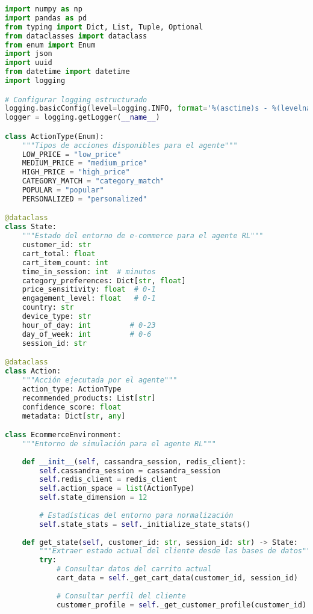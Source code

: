 \begin{lstlisting}[language=python, caption=Implementación Completa del Agente Q-Learning, label=lst:ql_implementation]
import numpy as np
import pandas as pd
from typing import Dict, List, Tuple, Optional
from dataclasses import dataclass
from enum import Enum
import json
import uuid
from datetime import datetime
import logging

# Configurar logging estructurado
logging.basicConfig(level=logging.INFO, format='%(asctime)s - %(levelname)s - %(message)s')
logger = logging.getLogger(__name__)

class ActionType(Enum):
    """Tipos de acciones disponibles para el agente"""
    LOW_PRICE = "low_price"
    MEDIUM_PRICE = "medium_price"  
    HIGH_PRICE = "high_price"
    CATEGORY_MATCH = "category_match"
    POPULAR = "popular"
    PERSONALIZED = "personalized"

@dataclass
class State:
    """Estado del entorno de e-commerce para el agente RL"""
    customer_id: str
    cart_total: float
    cart_item_count: int
    time_in_session: int  # minutos
    category_preferences: Dict[str, float]
    price_sensitivity: float  # 0-1
    engagement_level: float   # 0-1
    country: str
    device_type: str
    hour_of_day: int         # 0-23
    day_of_week: int         # 0-6
    session_id: str

@dataclass  
class Action:
    """Acción ejecutada por el agente"""
    action_type: ActionType
    recommended_products: List[str]
    confidence_score: float
    metadata: Dict[str, any]

class EcommerceEnvironment:
    """Entorno de simulación para el agente RL"""
    
    def __init__(self, cassandra_session, redis_client):
        self.cassandra_session = cassandra_session
        self.redis_client = redis_client
        self.action_space = list(ActionType)
        self.state_dimension = 12
        
        # Estadísticas del entorno para normalización
        self.state_stats = self._initialize_state_stats()
        
    def get_state(self, customer_id: str, session_id: str) -> State:
        """Extraer estado actual del cliente desde las bases de datos"""
        try:
            # Consultar datos del carrito actual
            cart_data = self._get_cart_data(customer_id, session_id)
            
            # Consultar perfil del cliente
            customer_profile = self._get_customer_profile(customer_id)
            

\end{lstlisting}

